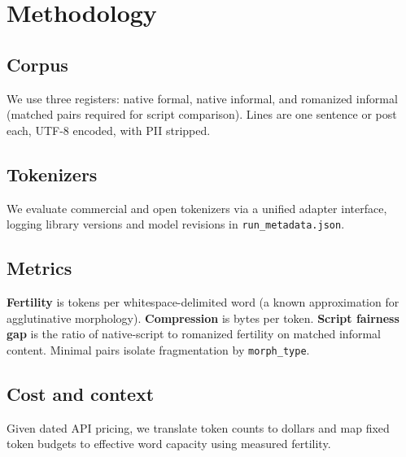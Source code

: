 \section{Methodology}

\subsection{Corpus}

We use three registers: native formal, native informal, and romanized informal
(matched pairs required for script comparison). Lines are one sentence or post
each, UTF-8 encoded, with PII stripped.

\subsection{Tokenizers}

We evaluate commercial and open tokenizers via a unified adapter interface,
logging library versions and model revisions in \texttt{run\_metadata.json}.

\subsection{Metrics}

\textbf{Fertility} is tokens per whitespace-delimited word (a known
approximation for agglutinative morphology). \textbf{Compression} is bytes
per token. \textbf{Script fairness gap} is the ratio of native-script to
romanized fertility on matched informal content. Minimal pairs isolate
fragmentation by \texttt{morph\_type}.

\subsection{Cost and context}

Given dated API pricing, we translate token counts to dollars and map fixed
token budgets to effective word capacity using measured fertility.
